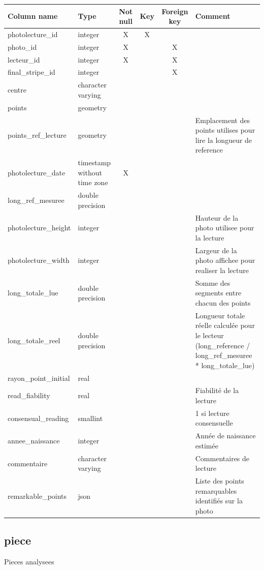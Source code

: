 \begin{tabular}{|l| p{2cm}|c|c|c| p{3cm}|}
\hline
Column name & Type & Not null & Key & Foreign key & Comment \\
\hline
photolecture\_id & integer & X & X & & \\
\hline
photo\_id & integer & X & & X & \\
\hline
lecteur\_id & integer & X & & X & \\
\hline
final\_stripe\_id & integer & & & X & \\
\hline
centre & character varying & & & & \\
\hline
points & geometry & & & & \\
\hline
points\_ref\_lecture & geometry & & & & Emplacement des points utilises pour lire la longueur de reference\\
\hline
photolecture\_date & timestamp without time zone & X & & & \\
\hline
long\_ref\_mesuree & double precision & & & & \\
\hline
photolecture\_height & integer & & & & Hauteur de la photo utilisee pour la lecture\\
\hline
photolecture\_width & integer & & & & Largeur de la photo affichee pour realiser la lecture\\
\hline
long\_totale\_lue & double precision & & & & Somme des segments entre chacun des points\\
\hline
long\_totale\_reel & double precision & & & & Longueur totale réelle calculée pour le lecteur (long\_reference / long\_ref\_mesuree * long\_totale\_lue)\\
\hline
rayon\_point\_initial & real & & & & \\
\hline
read\_fiability & real & & & & Fiabilité de la lecture\\
\hline
consensual\_reading & smallint & & & & 1 si lecture consensuelle\\
\hline
annee\_naissance & integer & & & & Année de naissance estimée\\
\hline
commentaire & character varying & & & & Commentaires de lecture\\
\hline
remarkable\_points & json & & & & Liste des points remarquables identifiés sur la photo\\
\hline
\end{tabular}
\subsection{piece}
Pieces analysees

